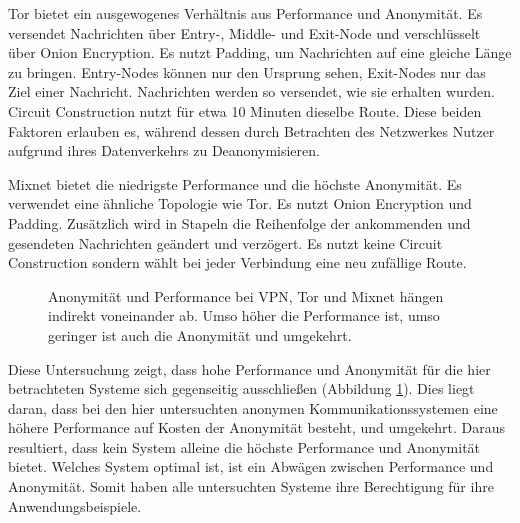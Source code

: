 Tor bietet ein ausgewogenes Verhältnis aus Performance und Anonymität. Es versendet Nachrichten über Entry-, Middle- und Exit-Node und verschlüsselt über Onion Encryption. Es nutzt Padding, um Nachrichten auf eine gleiche Länge zu bringen. Entry-Nodes können nur den Ursprung sehen, Exit-Nodes nur das Ziel einer Nachricht. Nachrichten werden so versendet, wie sie erhalten wurden. Circuit Construction nutzt für etwa 10 Minuten dieselbe Route. Diese beiden Faktoren erlauben es, während dessen durch Betrachten des Netzwerkes Nutzer aufgrund ihres Datenverkehrs zu Deanonymisieren.

Mixnet bietet die niedrigste Performance und die höchste Anonymität. Es verwendet eine ähnliche Topologie wie Tor. Es nutzt Onion Encryption und Padding. Zusätzlich wird in Stapeln die Reihenfolge der ankommenden und gesendeten Nachrichten geändert und verzögert. Es nutzt keine Circuit Construction sondern wählt bei jeder Verbindung eine neu zufällige Route.

\begin{figure}[h!]
    \centering
    
    \caption{Anonymität und Performance bei VPN, Tor und Mixnet hängen indirekt voneinander ab. Umso höher die Performance ist, umso geringer ist auch die Anonymität und umgekehrt.}
    \label{imgs:systems_discussion}
\end{figure}

Diese Untersuchung zeigt, dass hohe Performance und Anonymität für die hier betrachteten Systeme sich gegenseitig ausschließen (Abbildung \ref{imgs:systems_discussion}). Dies liegt daran, dass bei den hier untersuchten anonymen Kommunikationssystemen eine höhere Performance auf Kosten der Anonymität besteht, und umgekehrt. Daraus resultiert, dass kein System alleine die höchste Performance und Anonymität bietet. Welches System optimal ist, ist ein Abwägen zwischen Performance und Anonymität. Somit haben alle untersuchten Systeme ihre Berechtigung für ihre Anwendungsbeispiele.
